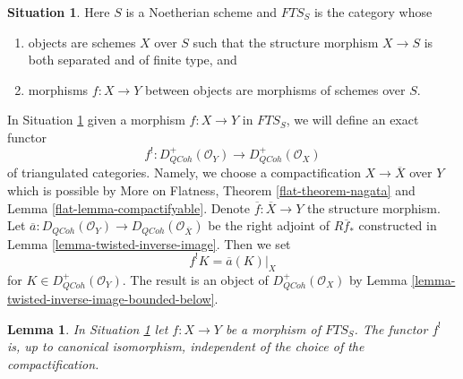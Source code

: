 \documentclass{stacks-project}
\theoremstyle{plain}
\newtheorem{lemma}[subsection]{Lemma}
\theoremstyle{definition}
\newtheorem{situation}[subsection]{Situation}
\theoremstyle{remark}
\numberwithin{equation}{subsection}
\def\QCoh{\mathit{QCoh}}
\begin{document}
\begin{situation}
\label{situation-shriek}
Here $S$ is a Noetherian scheme and $\textit{FTS}_S$ is the category whose
\begin{enumerate}
\item objects are schemes $X$ over $S$ such that the structure
morphism $X \to S$ is both separated and of finite type, and
\item morphisms $f : X \to Y$ between objects are morphisms
of schemes over $S$.
\end{enumerate}
\end{situation}

\noindent
In Situation \ref{situation-shriek} given a morphism $f : X \to Y$
in $\textit{FTS}_S$, we will define an exact functor
$$
f^! : D_\QCoh^+(\mathcal{O}_Y) \to D_\QCoh^+(\mathcal{O}_X)
$$
of triangulated categories. Namely, we choose a compactification
$X \to \overline{X}$ over $Y$ which is possible by
More on Flatness, Theorem \ref{flat-theorem-nagata} and
Lemma \ref{flat-lemma-compactifyable}.
Denote $\overline{f} : \overline{X} \to Y$
the structure morphism. Let
$\overline{a} : D_\QCoh(\mathcal{O}_Y) \to D_\QCoh(\mathcal{O}_{\overline{X}})$
be the right adjoint of $R\overline{f}_*$
constructed in Lemma \ref{lemma-twisted-inverse-image}. Then we set
$$
f^!K  = \overline{a}(K)|_X
$$
for $K \in D_\QCoh^+(\mathcal{O}_Y)$. The result is an object of
$D_\QCoh^+(\mathcal{O}_X)$ by
Lemma \ref{lemma-twisted-inverse-image-bounded-below}.

\begin{lemma}
\label{lemma-shriek-well-defined}
In Situation \ref{situation-shriek} let $f : X \to Y$ be a morphism
of $\textit{FTS}_S$. The functor $f^!$ is, up to canonical isomorphism,
independent of the choice of the compactification.
\end{lemma}
\end{document}
